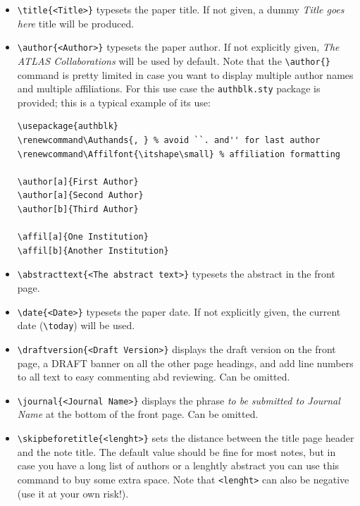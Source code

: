 \documentclass[11pt,a4paper]{atlasnote}
\begin{document}
\begin{itemize}

  \item {\verb|\title{<Title>}|} typesets the paper title. If not
    given, a dummy \emph{Title goes here} title will be produced.

  \item {\verb|\author{<Author>}|} typesets the paper author. If not
    explicitly given, \emph{The ATLAS Collaborations} will be used by
    default. Note that the \verb|\author{}| command is pretty limited
    in case you want to display multiple author names and multiple
    affiliations. For this use case the \verb|authblk.sty| package is
    provided; this is a typical example of its use:
    \begin{verbatim}
\usepackage{authblk}
\renewcommand\Authands{, } % avoid ``. and'' for last author
\renewcommand\Affilfont{\itshape\small} % affiliation formatting

\author[a]{First Author}
\author[a]{Second Author}
\author[b]{Third Author}

\affil[a]{One Institution}
\affil[b]{Another Institution}
    \end{verbatim}

  \item {\verb|\abstracttext{<The abstract text>}|} typesets the
    abstract in the front page.

  \item {\verb|\date{<Date>}|} typesets the paper date. If not
    explicitly given, the current date (\verb|\today|) will be used.

  \item {\verb|\draftversion{<Draft Version>}|} displays the draft
    version on the front page, a DRAFT banner on all the other page
    headings, and add line numbers to all text to easy commenting abd
    reviewing. Can be omitted.

  \item {\verb|\journal{<Journal Name>}|} displays the phrase \emph{to
    be submitted to Journal Name} at the bottom of the front page. Can
    be omitted.

  \item {\verb|\skipbeforetitle{<lenght>}|} sets the distance between
    the title page header and the note title. The default value should
    be fine for most notes, but in case you have a long list of
    authors or a lenghtly abstract you can use this command to buy
    some extra space. Note that \verb|<lenght>| can also be negative
    (use it at your own risk!).

\end{itemize}
\end{document}
